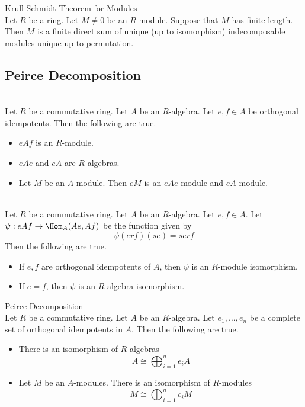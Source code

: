 \documentclass[a4paper]{article}
\begin{document}
\begin{thm}{Krull-Schmidt Theorem for Modules}{}\\
Let $R$ be a ring. Let $M\neq 0$ be an $R$-module. Suppose that $M$ has finite length. Then $M$ is a finite direct sum of unique (up to isomorphism) indecomposable modules unique up to permutation. 
\end{thm}

\subsection{Peirce Decomposition}
\begin{lmm}{}{}\\
Let $R$ be a commutative ring. Let $A$ be an $R$-algebra. Let $e,f\in A$ be orthogonal idempotents. Then the following are true. 
\begin{itemize}
\item $eAf$ is an $R$-module. 
\item $eAe$ and $eA$ are $R$-algebras. 
\item Let $M$ be an $A$-module. Then $eM$ is an $eAe$-module and $eA$-module. 
\end{itemize}
\end{lmm}

\begin{lmm}{}{}\\
Let $R$ be a commutative ring. Let $A$ be an $R$-algebra. Let $e,f\in A$. Let $\psi:eAf\to\Hom_A(Ae,Af)$ be the function given by $$\psi(erf)(se)=serf$$ Then the following are true. 
\begin{itemize}
\item If $e,f$ are orthogonal idempotents of $A$, then $\psi$ is an $R$-module isomorphism. 
\item If $e=f$, then $\psi$ is an $R$-algebra isomorphism. 
\end{itemize}
\end{lmm}

\begin{thm}{Peirce Decomposition}{}\\
Let $R$ be a commutative ring. Let $A$ be an $R$-algebra. Let $e_1,\dots,e_n$ be a complete set of orthogonal idempotents in $A$. Then the following are true. 
\begin{itemize}
\item There is an isomorphism of $R$-algebras $$A\cong\bigoplus_{i=1}^ne_iA$$
\item Let $M$ be an $A$-modules. There is an isomorphism of $R$-modules $$M\cong\bigoplus_{i=1}^ne_iM$$
\end{itemize}
\end{thm}
\end{document}

